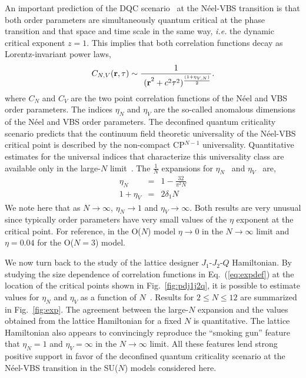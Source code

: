 \documentclass[range]{ar2e}
\begin{document}
An important prediction of the DQC scenario~\cite{Senthil04a} at the N\'eel-VBS transition is that both order parameters are
simultaneously quantum critical at the phase transition and that space and time scale in the same way, {\em i.e.} the dynamic critical 
exponent $z=1$. This implies that both correlation functions decay as Lorentz-invariant power laws,
\begin{equation}
\label{eq:expdef}
C_{N,V} ({\bf r},\tau) \sim  \frac{1}{~{(\bf r}^2+c^2\tau^2)^{\frac{(1+\eta_{V,N})}{2}}}.
\end{equation}
 where $C_N$ and $C_V$ are the two point correlation functions of the
 N\'eel and VBS order parameters. The indices $\eta_N$ and $\eta_V$
 are the so-called anomalous dimensions of the N\'eel and VBS order
 parameters. The deconfined quantum criticality scenario predicts that
 the continuum field theoretic universality of the N\'eel-VBS critical
 point is described by the non-compact CP$^{N-1}$ universality. Quantitative
 estimates for the universal indices that characterize this
 universality class are available only in the large-$N$
 limit~\cite{halperin1974:largeN}. The $\frac{1}{N}$ expansions for $\eta_N$~\cite{kaul2008:u1} and $\eta_V$~\cite{murthy1990:mono,metlitski2008:mono} are,
\begin{eqnarray}
\label{eq:oneonN}
\eta_N &=& 1 - \frac{32}{\pi^2N}\nonumber\\
1+\eta_V &=& 2 \delta_1 N
\end{eqnarray}
We note here that as $N\rightarrow\infty$, $\eta_N \rightarrow 1$ and
$\eta_V\rightarrow \infty$. Both results are very unusual since
typically order parameters have very small values of the $\eta$
exponent at the critical point. For reference, in the O($N$) model $\eta\rightarrow
0$ in the $N\rightarrow\infty$ limit and $\eta=0.04$ for the O($N=3$) model.

We now turn back to the study of the lattice designer $J_1$-$J_2$-$Q$
Hamiltonian. By studying the size dependence of correlation functions in Eq.~(\ref{eq:expdef})
 at the location of the critical points shown in Fig.~\ref{fig:pdj1j2q}, it is possible to
 estimate values for $\eta_N$ and $\eta_V$ as a function
 of $N$~\cite{lou2009:sun,kaul2011:j1j2}. Results for $2\leq N \leq 12$ are summarized in Fig.~\ref{fig:exp}. The
 agreement between the large-$N$ expansion and the values obtained from the
 lattice Hamiltonian for a fixed $N$ is quantitative. The lattice
 Hamiltonian also appears to convincingly reproduce the ``smoking gun'' feature that
 $\eta_N=1$ and $\eta_V=\infty$ in the $N\rightarrow \infty$
 limit. All these features lend strong positive support in favor of
 the deconfined quantum criticality scenario at the N\'eel-VBS
 transition in the SU($N$) models considered here.
\end{document}
